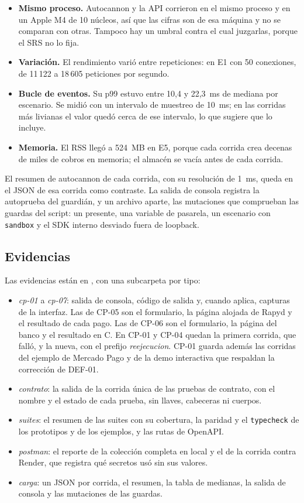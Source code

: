 \begin{itemize}
  \item \textbf{Mismo proceso.} Autocannon y la API corrieron en el mismo proceso y en un Apple M4 de 10 núcleos, así que las cifras son de esa máquina y no se comparan con otras. Tampoco hay un umbral contra el cual juzgarlas, porque el SRS no lo fija.
  \item \textbf{Variación.} El rendimiento varió entre repeticiones: en E1 con 50 conexiones, de 11\,122 a 18\,605 peticiones por segundo.
  \item \textbf{Bucle de eventos.} Su p99 estuvo entre 10{,}4 y 22{,}3~ms de mediana por escenario. Se midió con un intervalo de muestreo de 10~ms; en las corridas más livianas el valor quedó cerca de ese intervalo, lo que sugiere que lo incluye.
  \item \textbf{Memoria.} El RSS llegó a 524~MB en E5, porque cada corrida crea decenas de miles de cobros en memoria; el almacén se vacía antes de cada corrida.
\end{itemize}

El resumen de autocannon de cada corrida, con su resolución de 1~ms, queda en el JSON de esa corrida como contraste. La salida de consola registra la autoprueba del guardián, y un archivo aparte, las mutaciones que comprueban las guardas del script: un  presente, una variable de pasarela, un escenario con \texttt{sandbox} y el SDK interno desviado fuera de loopback.

\subsection{Evidencias}

Las evidencias están en , con una subcarpeta por tipo:

\begin{itemize}
  \item \emph{cp-01} a \emph{cp-07}: salida de consola, código de salida y, cuando aplica, capturas de la interfaz. Las de CP-05 son el formulario, la página alojada de Rapyd y el resultado de cada pago. Las de CP-06 son el formulario, la página del banco y el resultado en C. En CP-01 y CP-04 quedan la primera corrida, que falló, y la nueva, con el prefijo \emph{reejecucion}. CP-01 guarda además las corridas del ejemplo de Mercado Pago y de la demo interactiva que respaldan la corrección de DEF-01.
  \item \emph{contrato}: la salida de la corrida única de las pruebas de contrato, con el nombre y el estado de cada prueba, sin llaves, cabeceras ni cuerpos.
  \item \emph{suites}: el resumen de las suites con su cobertura, la paridad y el \texttt{typecheck} de los prototipos y de los ejemplos, y las rutas de OpenAPI.
  \item \emph{postman}: el reporte de la colección completa en local y el de la corrida contra Render, que registra qué secretos usó sin sus valores.
  \item \emph{carga}: un JSON por corrida, el resumen, la tabla de medianas, la salida de consola y las mutaciones de las guardas.
\end{itemize}

